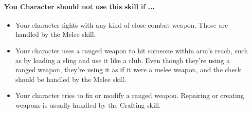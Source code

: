 \begin{multicols}{2}
\paragraph{You Character should not use this skill if ...}
\begin{itemize}
    \item Your character fights with any kind of close combat weapon. Those are
        handled by the Melee skill.
    \item Your character uses a ranged weapon to hit someone within arm's reach,
        such as by loading a sling and use it like a club. Even though they're
        using a ranged weapon, they’re using it as if it were a melee weapon, and
        the check should be handled by the Melee skill.
    \item Your character tries to fix or modify a ranged weapon. Repairing or
        creating weapons is usually handled by the Crafting skill.
\end{itemize}

\end{multicols}
\hrulefill
